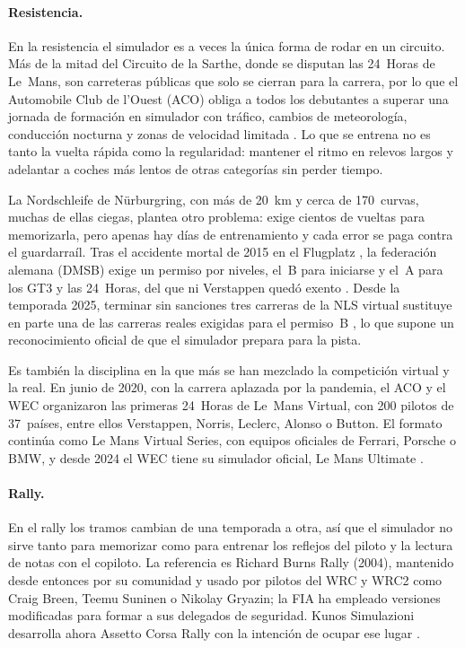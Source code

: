\paragraph{Resistencia.}
En la resistencia el simulador es a veces la única forma de rodar en un circuito. Más de la mitad del Circuito de la Sarthe, donde se disputan las 24~Horas de Le~Mans, son carreteras públicas que solo se cierran para la carrera, por lo que el Automobile Club de l'Ouest (ACO) obliga a todos los debutantes a superar una jornada de formación en simulador con tráfico, cambios de meteorología, conducción nocturna y zonas de velocidad limitada \parencite{fiawec_news}. Lo que se entrena no es tanto la vuelta rápida como la regularidad: mantener el ritmo en relevos largos y adelantar a coches más lentos de otras categorías sin perder tiempo.

La Nordschleife de Nürburgring, con más de 20~km y cerca de 170~curvas, muchas de ellas ciegas, plantea otro problema: exige cientos de vueltas para memorizarla, pero apenas hay días de entrenamiento y cada error se paga contra el guardarraíl. Tras el accidente mortal de 2015 en el Flugplatz \parencite{nls_news}, la federación alemana (DMSB) exige un permiso por niveles, el~B para iniciarse y el~A para los GT3 y las 24~Horas, del que ni Verstappen quedó exento \parencite{dmsb_permit_nordschleife, motorsport_com}. Desde la temporada 2025, terminar sin sanciones tres carreras de la NLS virtual sustituye en parte una de las carreras reales exigidas para el permiso~B \parencite{dmsb_permit_nordschleife}, lo que supone un reconocimiento oficial de que el simulador prepara para la pista.

Es también la disciplina en la que más se han mezclado la competición virtual y la real. En junio de 2020, con la carrera aplazada por la pandemia, el ACO y el WEC organizaron las primeras 24~Horas de Le~Mans Virtual, con 200 pilotos de 37~países, entre ellos Verstappen, Norris, Leclerc, Alonso o Button. El formato continúa como Le Mans Virtual Series, con equipos oficiales de Ferrari, Porsche o BMW, y desde 2024 el WEC tiene su simulador oficial, Le Mans Ultimate \parencite{fiawec_news}.

\paragraph{Rally.}
En el rally los tramos cambian de una temporada a otra, así que el simulador no sirve tanto para memorizar como para entrenar los reflejos del piloto y la lectura de notas con el copiloto. La referencia es Richard Burns Rally (2004), mantenido desde entonces por su comunidad y usado por pilotos del WRC y WRC2 como Craig Breen, Teemu Suninen o Nikolay Gryazin; la FIA ha empleado versiones modificadas para formar a sus delegados de seguridad. Kunos Simulazioni desarrolla ahora Assetto Corsa Rally con la intención de ocupar ese lugar \parencite{traxion_news}.


